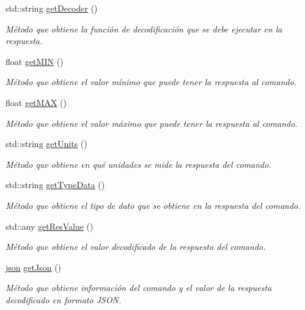 \begin{DoxyCompactItemize}
std\+::string \hyperlink{classCommands_a8b4c2a655d8dd3de334338d6684d469c}{get\+Decoder} ()
\begin{DoxyCompactList}\small\item\em Método que obtiene la función de decodificación que se debe ejecutar en la respuesta. \end{DoxyCompactList}\item 
float \hyperlink{classCommands_af0a1e2ea65b5a57997c721a8d77a1013}{get\+M\+IN} ()
\begin{DoxyCompactList}\small\item\em Método que obtiene el valor mínimo que puede tener la respuesta al comando. \end{DoxyCompactList}\item 
float \hyperlink{classCommands_afbad1051313d0cdecba276384cb7fc6b}{get\+M\+AX} ()
\begin{DoxyCompactList}\small\item\em Método que obtiene el valor máximo que puede tener la respuesta al comando. \end{DoxyCompactList}\item 
std\+::string \hyperlink{classCommands_ac67214a4fbd93fbb4d8ebb2dd815a3fa}{get\+Units} ()
\begin{DoxyCompactList}\small\item\em Método que obtiene en qué unidades se mide la respuesta del comando. \end{DoxyCompactList}\item 
std\+::string \hyperlink{classCommands_a7d983e153465d335db0b3ad7724b8ef6}{get\+Type\+Data} ()
\begin{DoxyCompactList}\small\item\em Método que obtiene el tipo de dato que se obtiene en la respuesta del comando. \end{DoxyCompactList}\item 
std\+::any \hyperlink{classCommands_a72801682a4ac2ba214b0ca0d4b85b974}{get\+Res\+Value} ()
\begin{DoxyCompactList}\small\item\em Método que obtiene el valor decodificado de la respuesta del comando. \end{DoxyCompactList}\item 
\hyperlink{Commands_8hpp_ab701e3ac61a85b337ec5c1abaad6742d}{json} \hyperlink{classCommands_a0359da788a50c6aad69153dc0f2644e4}{get\+Json} ()
\begin{DoxyCompactList}\small\item\em Método que obtiene información del comando y el valor de la respuesta decodificado en formato J\+S\+ON. \end{DoxyCompactList}\item 

\end{DoxyCompactItemize}
